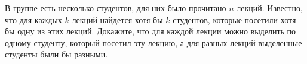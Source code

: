 В группе есть несколько студентов, для них было прочитано $n$ лекций. Известно, что для каждых $k$ лекций
найдется хотя бы $k$ студентов, которые посетили хотя бы одну из этих лекций. Докажите, что для каждой
лекции можно выделить по одному студенту, который посетил эту лекцию, а для разных лекций выделенные
студенты были бы разными.

